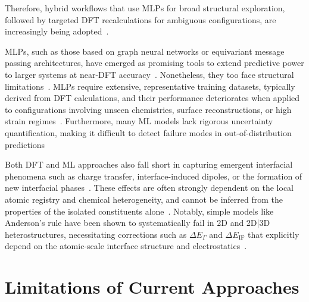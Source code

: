 Therefore, hybrid workflows that use MLPs for broad structural exploration, followed by targeted DFT recalculations for ambiguous configurations, are increasingly being adopted~\cite{Gerber2023-yd, Rosen2022-pw, Schutt2019-sz}.

MLPs, such as those based on graph neural networks or equivariant message passing architectures, have emerged as promising tools to extend predictive power to larger systems at near-DFT accuracy~\nocite{}.
Nonetheless, they too face structural limitations~\nocite{}.
MLPs require extensive, representative training datasets, typically derived from DFT calculations, and their performance deteriorates when applied to configurations involving unseen chemistries, surface reconstructions, or high strain regimes~\cite{Batzner2022-fd, Owen2024-wp, Wang2024-tn}.
Furthermore, many ML models lack rigorous uncertainty quantification, making it difficult to detect failure modes in out-of-distribution predictions~\cite{Leitherer2023-ew}

\newpage Both DFT and ML approaches also fall short in capturing emergent interfacial phenomena such as charge transfer, interface-induced dipoles, or the formation of new interfacial phases~\nocite{}.
These effects are often strongly dependent on the local atomic registry and chemical heterogeneity, and cannot be inferred from the properties of the isolated constituents alone~\cite{Butler2019-ws, Owen2024-wp}.
Notably, simple models like Anderson's rule have been shown to systematically fail in 2D and 2D|3D heterostructures, necessitating corrections such as $\Delta E_\Gamma$ and $\Delta E_\mathrm{IF}$ that explicitly depend on the atomic-scale interface structure and electrostatics~\cite{Taylor2023-wh}.

\newpage \section{Limitations of Current Approaches}


